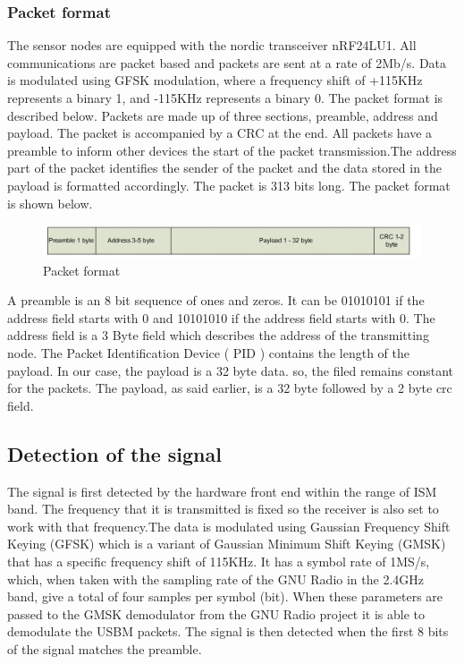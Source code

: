 \documentclass[a4paper,10pt]{article}
\begin{document}
\subsubsection{Packet format}
The sensor nodes are equipped with the nordic transceiver nRF24LU1.
All communications are packet based and packets are sent at a rate
of 2Mb/s. Data is modulated using GFSK modulation, where a frequency
shift of +115KHz represents a binary 1, and -115KHz represents a
binary 0. The packet format is described below. \newline Packets are
made up of three sections, preamble, address and payload. The packet
is accompanied by a CRC at the end. All packets have a preamble to
inform other devices the start of the packet transmission.The
address part of the packet identifies the sender of the packet and
the data stored in the payload is formatted accordingly. The packet
is 313 bits long. The packet format is shown below. 
\begin{figure}
\centering
\includegraphics[width= 1\textwidth]{packet}
\caption{Packet format}
\label{packet}
\end{figure}
A preamble is an 8 bit sequence of ones and zeros. It can be 01010101
if the address field starts with 0 and 10101010 if the address field
starts with 0. The address field is a 3 Byte field which describes
the address of the transmitting node. The Packet Identification
Device ( PID ) contains the length of the payload. In our case, the
payload is a 32 byte data. so, the filed remains constant for the
packets. The payload, as said earlier, is a
 32 byte followed by a 2 byte crc field.
\subsection{Detection of the signal}
The signal is first detected by the hardware front end within the
range of ISM band. The frequency that it is transmitted is fixed so
the receiver is also set to work with that frequency.The data is
modulated using Gaussian Frequency Shift Keying (GFSK) which is a
variant of Gaussian Minimum Shift Keying (GMSK) that has a specific
frequency shift of 115KHz. It has a symbol rate of 1MS/s, which,
when taken with the sampling rate of the GNU Radio in the 2.4GHz
band, give a total of four samples per symbol (bit). When these
parameters are passed to the GMSK demodulator from the GNU Radio
project it is able to demodulate the USBM packets. The signal is
then detected when the first 8 bits of the signal matches the
preamble.
\end{document}
